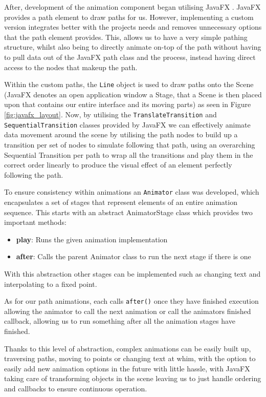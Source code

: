 \documentclass[a4paper,fleqn,twoside,12pt]{article}
\begin{document}
After, development of the animation component began utilising JavaFX \cite{sunmicrosystems_2022_javafx}. JavaFX provides a path element to draw paths for us. However, implementing a custom version integrates better with the projects needs and removes unnecessary options that the path element provides. This, allows us to have a very simple pathing structure, whilst also being to directly animate on-top of the path without having to pull data out of the JavaFX path class and the process, instead having direct access to the nodes that makeup the path.

Within the custom paths, the \texttt{Line} object is used to draw paths onto the Scene (JavaFX denotes an open application window a Stage, that a Scene is then placed upon that contains our entire interface and its moving parts) as seen in Figure \ref{fig:javafx_layout}. Now, by utilising the \texttt{TranslateTransition} and \texttt{SequentialTransition} classes provided by JavaFX we can effectively animate data movement around the scene by utilising the path nodes to build up a transition per set of nodes to simulate following that path, using an overarching Sequential Transition per path to wrap all the transitions and play them in the correct order linearly to produce the visual effect of an element perfectly following the path.

To ensure consistency within animations an \texttt{Animator} class was developed, which encapsulates a set of stages that represent elements of an entire animation sequence. This starts with an abstract AnimatorStage class which provides two important methods:
\begin{itemize}
    \item \textbf{play}: Runs the given animation implementation
    \item \textbf{after}: Calls the parent Animator class to run the next stage if there is one
\end{itemize}

With this abstraction other stages can be implemented such as changing text and interpolating to a fixed point. 

As for our path animations, each calls \texttt{after()} once they have finished execution allowing the animator to call the next animation or call the animators finished callback, allowing us to run something after all the animation stages have finished.

Thanks to this level of abstraction, complex animations can be easily built up, traversing paths, moving to points or changing text at whim, with the option to easily add new animation options in the future with little hassle, with JavaFX taking care of transforming objects in the scene leaving us to just handle ordering and callbacks to ensure continuous operation.
\end{document}
